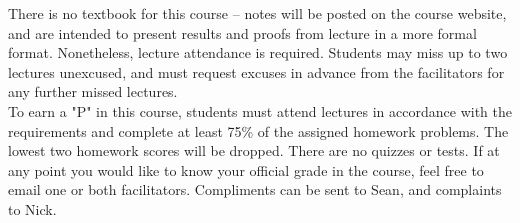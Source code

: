 \documentclass{article}
\begin{document}
\noindent
There is no textbook for this course -- notes will be posted on the course website, and are intended to present results and proofs from lecture in a more formal format. Nonetheless, lecture attendance is required. Students may miss up to two lectures unexcused, and must request excuses in advance from the facilitators for any further missed lectures. \\

\noindent
To earn a "P" in this course, students must attend lectures in accordance with the requirements and complete at least 75\% of the assigned homework problems. The lowest two homework scores will be dropped. There are no quizzes or tests. If at any point you would like to know your official grade in the course, feel free to email one or both facilitators. Compliments can be sent to Sean, and complaints to Nick.
\end{document}
